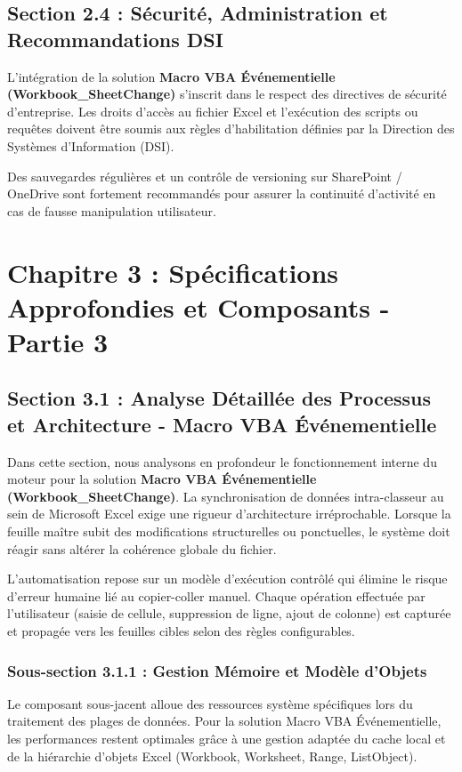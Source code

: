 \documentclass[12pt,a4paper]{report}
\begin{document}
\section{Section 2.4 : Sécurité, Administration et Recommandations DSI}
L'intégration de la solution \textbf{Macro VBA Événementielle (Workbook\_SheetChange)} s'inscrit dans le respect des directives de sécurité d'entreprise. Les droits d'accès au fichier Excel et l'exécution des scripts ou requêtes doivent être soumis aux règles d'habilitation définies par la Direction des Systèmes d'Information (DSI).

Des sauvegardes régulières et un contrôle de versioning sur SharePoint / OneDrive sont fortement recommandés pour assurer la continuité d'activité en cas de fausse manipulation utilisateur.


\chapter{Chapitre 3 : Spécifications Approfondies et Composants - Partie 3}

\section{Section 3.1 : Analyse Détaillée des Processus et Architecture - Macro VBA Événementielle}
Dans cette section, nous analysons en profondeur le fonctionnement interne du moteur pour la solution \textbf{Macro VBA Événementielle (Workbook\_SheetChange)}. La synchronisation de données intra-classeur au sein de Microsoft Excel exige une rigueur d'architecture irréprochable. Lorsque la feuille maître subit des modifications structurelles ou ponctuelles, le système doit réagir sans altérer la cohérence globale du fichier.

L'automatisation repose sur un modèle d'exécution contrôlé qui élimine le risque d'erreur humaine lié au copier-coller manuel. Chaque opération effectuée par l'utilisateur (saisie de cellule, suppression de ligne, ajout de colonne) est capturée et propagée vers les feuilles cibles selon des règles configurables.


\subsection{Sous-section 3.1.1 : Gestion Mémoire et Modèle d'Objets}
Le composant sous-jacent alloue des ressources système spécifiques lors du traitement des plages de données. Pour la solution Macro VBA Événementielle, les performances restent optimales grâce à une gestion adaptée du cache local et de la hiérarchie d'objets Excel (Workbook, Worksheet, Range, ListObject).
\end{document}
